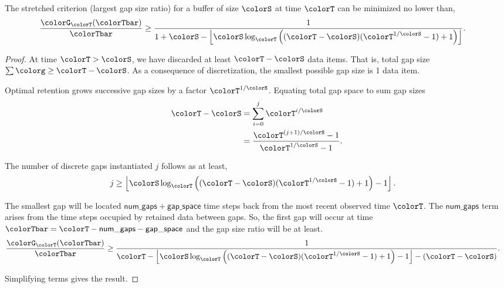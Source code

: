 \begin{lemma}
\label{thm:stretched-ideal-strict}
The stretched criterion (largest gap size ratio) for a buffer of size $\colorS$ at time $\colorT$ can be minimized no lower than,
\begin{align*}
\frac{\colorG_{\colorT}(\colorTbar)}{\colorTbar}
&\geq
\frac{
  1
}{
  1 + \colorS
  - \left\lfloor \colorS \log_{\colorT}\Big(
    (\colorT - \colorS)(\colorT^{1/\colorS} - 1) + 1
  \Big)\right\rfloor
}.
\end{align*}
\end{lemma}

\begin{proof}
At time $\colorT > \colorS$, we have discarded at least $\colorT - \colorS$ data items.
That is, total gap size $\sum \colorg \geq \colorT - \colorS$.
As a consequence of discretization, the smallest possible gap size is 1 data item.

Optimal retention grows successive gap sizes by a factor $\colorT^{1/\colorS}$.
Equating total gap space to sum gap sizes
\begin{align*}
\colorT - \colorS
&=
\sum_{i = 0}^{j} \colorT^{i/\colorS} %
\\
&=
\frac{
  \colorT^{(j + 1)/\colorS} - 1
}{
  \colorT^{1/\colorS} - 1
}.
\end{align*}

The number of discrete gaps instantiated $j$ follows as at least,
\begin{align*}
j
&\geq
\left\lfloor
\colorS \log_{\colorT}\Big(
  (\colorT - \colorS)(\colorT^{1/\colorS} - 1) + 1
\Big) - 1
\right\rfloor.
\end{align*}

The smallest gap will be located $\mathsf{num\_gaps} + \mathsf{gap\_space}$ time steps back from the most recent observed time $\colorT$.
The $\mathsf{num\_gaps}$ term arises from the time steps occupied by retained data between gaps.
So, the first gap will occur at time $\colorTbar = \colorT - \mathsf{num\_gaps} - \mathsf{gap\_space}$ and the gap size ratio will be at least.
\begin{align*}
\frac{\colorG_{\colorT}(\colorTbar)}{\colorTbar}
&\geq
\frac{1}{
\colorT
- \left\lfloor
\colorS \log_{\colorT}\Big(
  (\colorT - \colorS)(\colorT^{1/\colorS} - 1) + 1
\Big) - 1
\right\rfloor - (\colorT - \colorS)
}.
\end{align*}

Simplifying terms gives the result.
\end{proof}
